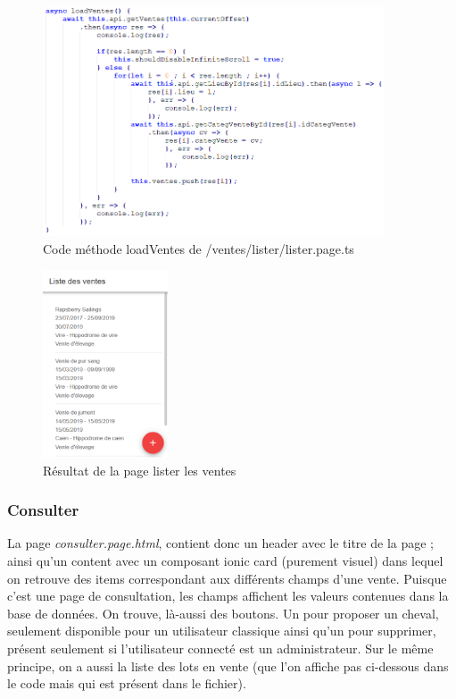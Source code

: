 					\begin{figure}[H]
						\centering\includegraphics[width=0.9\textwidth, keepaspectratio]{res/listerTs.png}
						\caption{Code méthode loadVentes de /ventes/lister/lister.page.ts}
					\end{figure}

					\begin{figure}[H]
						\centering\includegraphics[width=0.33\textwidth, keepaspectratio]{res/listerVentes.png}
						\caption{Résultat de la page lister les ventes}
					\end{figure}

			\subsubsection{Consulter}

			La page \textit{consulter.page.html}, contient donc un header avec le titre de la page ; ainsi qu'un content avec un composant ionic card (purement visuel) dans lequel on retrouve des items correspondant aux différents champs d'une vente.\newline
			Puisque c'est une page de consultation, les champs affichent les valeurs contenues dans la base de données.\newline
			On trouve, là-aussi des boutons. Un pour proposer un cheval, seulement disponible pour un utilisateur classique ainsi qu'un pour supprimer, présent seulement si l'utilisateur connecté est un administrateur. \newline
			Sur le même principe, on a aussi la liste des lots en vente (que l'on affiche pas ci-dessous dans le code mais qui est présent dans le fichier).

